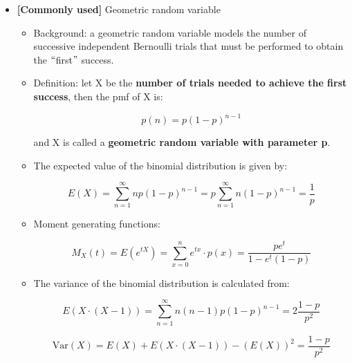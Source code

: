 \documentclass[12pt]{report}
\renewcommand{\_}{\kern-1.5pt\textunderscore\kern-1.5pt}
\begin{document}
\begin{itemize}
	\item \textbf{[Commonly used]} Geometric random variable\par

\begin{itemize}
	\item Background: a geometric random variable models the number of successive independent Bernoulli trials that must be performed to obtain the $``$first$"$  success. \par

	\item Definition: let X be the \textbf{number of trials needed to achieve the first success}, then the pmf of X is:\par

 \[ p \left( n \right) =p \left( 1-p \right) ^{n-1} \] \par

and X is called a \textbf{geometric random variable with parameter p}. \par

	\item The expected value of the binomial distribution is given by:\par

 \[ E \left( X \right) = \sum _{n=1}^{\infty}np \left( 1-p \right) ^{n-1}=p \sum _{n=1}^{\infty}n \left( 1-p \right) ^{n-1}=\frac{1}{p} \] \par

	\item Moment generating functions:\par

 \[ M_{X} \left( t \right) =E \left( e^{tX} \right) = \sum _{x=0}^{n}e^{tx} \cdot p \left( x \right) =\frac{pe^{t}}{1-e^{t} \left( 1-p \right) } \] \par

	\item The variance of the binomial distribution is calculated from:\par

 \[ E \left( X \cdot  \left( X-1 \right)  \right) = \sum _{n=1}^{\infty}n \left( n-1 \right) p \left( 1-p \right) ^{n-1}=2\frac{1-p}{p^{2}} \] \par

 \[ \mathrm{Var} \left( X \right) =E \left( X \right) +E \left( X \cdot  \left( X-1 \right)  \right) - \left( E \left( X \right)  \right) ^{2}=\frac{1-p}{p^{2}} \] \par


\end{itemize}
\end{itemize}
\end{document}
